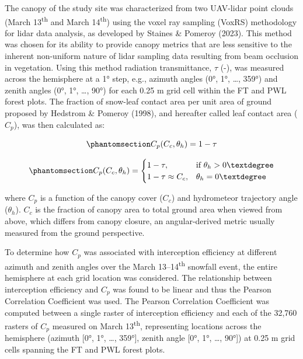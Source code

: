 \documentclass[
  letterpaper,
  DIV=11,
  numbers=noendperiod]{scrartcl}
\begin{document}
The canopy of the study site was characterized from two UAV-lidar point
clouds (March 13\textsuperscript{th} and March 14\textsuperscript{th})
using the voxel ray sampling (VoxRS) methodology for lidar data
analysis, as developed by Staines \& Pomeroy (2023). This method was
chosen for its ability to provide canopy metrics that are less sensitive
to the inherent non-uniform nature of lidar sampling data resulting from
beam occlusion in vegetation. Using this method radiation transmittance,
\(\tau\) (-), was measured across the hemisphere at a 1° step, e.g.,
azimuth angles (0°, 1°, \ldots, 359°) and zenith angles (0°, 1°, \ldots,
90°) for each 0.25 m grid cell within the FT and PWL forest plots. The
fraction of snow-leaf contact area per unit area of ground proposed by
Hedstrom \& Pomeroy (1998), and hereafter called leaf contact area
(\(C_p\)), was then calculated as:

\begin{equation}\phantomsection\label{eq-lca}{
C_p(C_c, \theta_h) = 1-\tau
}\end{equation}

\begin{equation}\phantomsection\label{eq-tf-ode}{
C_p(C_c, \theta_h) = \begin{cases}
    1-\tau,& \text{if } \theta_h> 0°\\
    1-\tau \approx C_c ,              & \theta_h= 0°
\end{cases}
}\end{equation}

where \(C_p\) is a function of the canopy cover (\(C_c\)) and
hydrometeor trajectory angle (\(\theta_h\)). \(C_c\) is the fraction of
canopy area to total ground area when viewed from above, which differs
from canopy closure, an angular-derived metric usually measured from the
ground perspective.

To determine how \(C_p\) was associated with interception efficiency at
different azimuth and zenith angles over the March
13--14\textsuperscript{th} snowfall event, the entire hemisphere at each
grid location was considered. The relationship between interception
efficiency and \(C_p\) was found to be linear and thus the Pearson
Correlation Coefficient was used. The Pearson Correlation Coefficient
was computed between a single raster of interception efficiency and each
of the 32,760 rasters of \(C_p\) measured on March
13\textsuperscript{th}, representing locations across the hemisphere
(azimuth {[}0°, 1°, \ldots, 359°{]}, zenith angle {[}0°, 1°, \ldots,
90°{]}) at 0.25 m grid cells spanning the FT and PWL forest plots.
\end{document}

